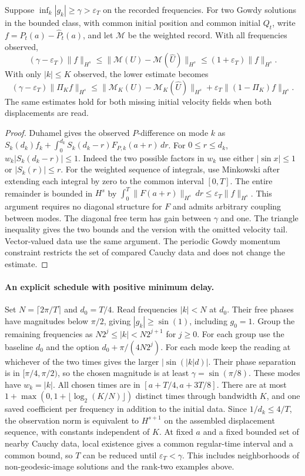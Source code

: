 \begin{theorem}
\label{th:nonlinear-band}
Suppose $\inf_k |g_k|\ge\gamma>\varepsilon_T$ on the
recorded frequencies. For two Gowdy solutions in the
bounded class, with common initial position and common
initial $Q_t$, write $f=P_t(a)-\widehat P_t(a)$,
and let $\mathcal M$ be the weighted record. With all
frequencies observed,
\[
 (\gamma-\varepsilon_T)\|f\|_{H^s}
 \le \|\mathcal M(U)-\mathcal M(\widehat U)\|_{H^s}
 \le (1+\varepsilon_T)\|f\|_{H^s}.
\]
With only $|k|\le K$ observed, the lower estimate becomes
\[
 (\gamma-\varepsilon_T)\|\Pi_K f\|_{H^s}
 \le \|\mathcal M_K(U)-\mathcal M_K(\widehat U)\|_{H^s}
       +\varepsilon_T\|(1-\Pi_K)f\|_{H^s}.
\]
The same estimates hold for both missing initial velocity
fields when both displacements are read.
\end{theorem}

\begin{proof}
Duhamel gives the observed $P$-difference on mode $k$
as $S_k(d_k)f_k+\int_0^{d_k} S_k(d_k-r)F_{P,k}(a+r)\,dr$.
For $0\le r\le d_k$, $w_k|S_k(d_k-r)|\le1$.
Indeed the two possible factors in $w_k$ use either
$|\sin x|\le1$ or $|S_k(r)|\le r$.
For the weighted sequence of integrals, use Minkowski after
extending each integral by zero to the common interval $[0,T]$.
The entire remainder is bounded in $H^s$ by
$\int_0^T\|F(a+r)\|_{H^s}\,dr\le\varepsilon_T\|f\|_{H^s}$.
This argument requires no diagonal structure for $F$ and admits
arbitrary coupling between modes.
The diagonal free term has gain between $\gamma$ and one.
The triangle inequality gives the two bounds and the version
with the omitted velocity tail. Vector-valued data use
the same argument. The periodic Gowdy momentum constraint
restricts the set of compared Cauchy data and does not
change the estimate.
\end{proof}

\paragraph{An explicit schedule with positive minimum delay.}
Set $N=\lceil 2\pi/T\rceil$ and $d_0=T/4$.
Read frequencies $|k|<N$ at $d_0$.
Their free phases have magnitudes below $\pi/2$, giving
$|g_k|\ge\sin(1)$, including $g_0=1$.
Group the remaining frequencies as
$N2^j\le |k|<N2^{j+1}$ for $j\ge0$.
For each group use the baseline $d_0$ and the option
$d_0+\pi/(4N2^j)$. For each mode keep the reading at
whichever of the two times gives the larger
$|\sin(|k|d)|$. Their phase separation is in
$[\pi/4,\pi/2)$, so the chosen magnitude is at least
$\gamma=\sin(\pi/8)$. These modes have $w_k=|k|$.
All chosen times are in $[a+T/4,a+3T/8]$.
There are at most $1+\max(0,1+\lfloor\log_2(K/N)\rfloor)$
distinct times through bandwidth $K$, and one saved
coefficient per frequency in addition to the initial
data. Since $1/d_k\le4/T$, the observation norm is
equivalent to $H^{s+1}$ on the assembled displacement
sequence, with constants independent of $K$.
At fixed $a$ and a fixed bounded set of nearby Cauchy data,
local existence gives a common regular-time interval and a common
bound, so $T$ can be reduced until $\varepsilon_T<\gamma$.
This includes neighborhoods of non-geodesic-image
solutions and the rank-two examples above.

